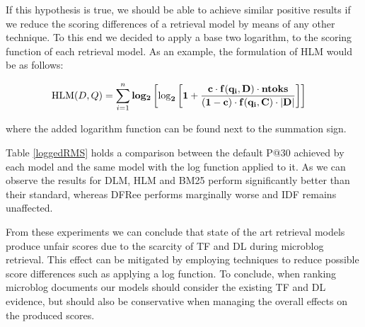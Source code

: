 If this hypothesis is true, we should be able to achieve similar positive results if we reduce the scoring differences of a retrieval model by means of any other technique. To this end we decided to apply a base two logarithm, to the scoring function of each retrieval model. As an example, the formulation of HLM would be as follows: 

\begin{small}
	\begin{align}
	\label{hlmformulalog}
	\text{HLM}(D,Q) &=  \sum_{i=1}^{n} \bf{log_2} \left[ \log_2 \left[ 1 + \frac{c \cdot f(q_i, D) \cdot ntoks }{ (1-c) \cdot f(q_i, C) \cdot |D|} \right] \right]
	\end{align}
\end{small}

\noindent where the added logarithm function can be found next to the summation sign.

Table \ref{loggedRMS} holds a comparison between the default P@30 achieved by each model and the same model with the log function applied to it. As we can observe the results for DLM, HLM and BM25 perform significantly better than their standard, whereas DFRee performs marginally worse and IDF remains unaffected.

From these experiments we can conclude that state of the art retrieval models produce unfair scores due to the scarcity of TF and DL during microblog retrieval. This effect can be mitigated by employing techniques to reduce possible score differences such as applying a log function. To conclude, when ranking microblog documents our models should consider the existing TF and DL evidence, but should also be conservative when managing the overall effects on the produced scores.
%

